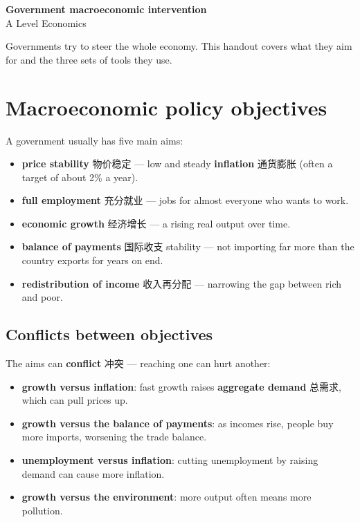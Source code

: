 \documentclass[11pt]{article}
\begin{document}
\begin{center}
  {\LARGE\bfseries Government macroeconomic intervention}\\[0.35em]
  {\large A Level Economics}
\end{center}
\vspace{0.6em}

Governments try to steer the whole economy. This handout covers what they aim for and the three sets of tools they use.

\section*{Macroeconomic policy objectives}

A government usually has five main aims:

\begin{itemize}
\item \textbf{price stability} 物价稳定 — low and steady \textbf{inflation} 通货膨胀 (often a target of about 2\% a year).

\item \textbf{full employment} 充分就业 — jobs for almost everyone who wants to work.

\item \textbf{economic growth} 经济增长 — a rising real output over time.

\item \textbf{balance of payments} 国际收支 stability — not importing far more than the country exports for years on end.

\item \textbf{redistribution of income} 收入再分配 — narrowing the gap between rich and poor.

\end{itemize}

\subsection*{Conflicts between objectives}

The aims can \textbf{conflict} 冲突 — reaching one can hurt another:

\begin{itemize}
\item \textbf{growth versus inflation}: fast growth raises \textbf{aggregate demand} 总需求, which can pull prices up.

\item \textbf{growth versus the balance of payments}: as incomes rise, people buy more imports, worsening the trade balance.

\item \textbf{unemployment versus inflation}: cutting unemployment by raising demand can cause more inflation.

\item \textbf{growth versus the environment}: more output often means more pollution.

\end{itemize}
\end{document}
